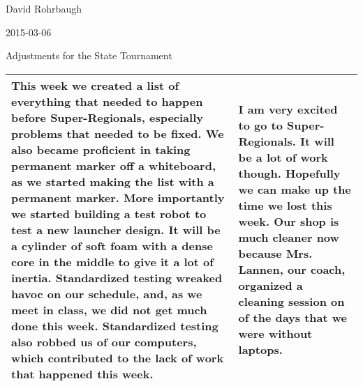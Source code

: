 David Rohrbaugh

2015-03-06

Adjustments for the State Tournament

\begin{tabular}{|p{5cm}|p{5cm}|}
 \hline
 This week we created a list of everything that needed to happen before Super-Regionals, especially problems that needed to be fixed. We also became proficient in taking permanent marker off a whiteboard, as we started making the list with a permanent marker. More importantly we started building a test robot to test a new launcher design. It will be a cylinder of soft foam with a dense core in the middle to give it a lot of inertia. Standardized testing wreaked havoc on our schedule, and, as we meet in class, we did not get much done this week. Standardized testing also robbed us of our computers, which contributed to the lack of work that happened this week.&
 I am very excited to go to Super-Regionals. It will be a lot of work though. Hopefully we can make up the time we lost this week. Our shop is much cleaner now because Mrs. Lannen, our coach, organized a cleaning session on of the days that we were without laptops.\\
 \hline
\end{tabular}


